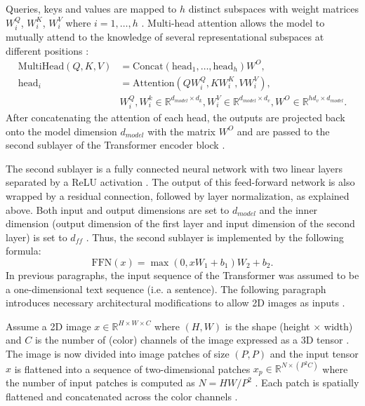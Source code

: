 Queries, keys and values are mapped to $h$ distinct subspaces with weight matrices $W_i^Q$, $W_i^K$, $W_i^V$ where $i=1,\dots,h$ \citep{Vaswani2017}.
Multi-head attention allows the model to mutually attend to the knowledge of several representational subspaces at different positions \citep{Vaswani2017}:
\begin{align}
	\text{MultiHead}(Q,K,V) &= \text{Concat}(\text{head}_1,\dots,\text{head}_h)W^O, \\
	\text{head}_i & = \text{Attention}(QW_i^Q,KW_i^K,VW_i^V), \\
	& W_{i}^{Q}, W_{i}^{k} \in \mathbb{R}^{d_{model}\times d_k} , W_i^V \in \mathbb{R}^{d_{model} \times d_v}, W^O \in \mathbb{R}^{hd_v \times d_{model}}.	
\end{align}
After concatenating the attention of each head, the outputs are projected back onto the model dimension $d_{model}$ with the matrix $W^O$ and are passed to the second sublayer of the Transformer encoder block \citep{Vaswani2017}.
\par
The second sublayer is a fully connected neural network with two linear layers separated by a ReLU activation \citep{Vaswani2017}.
The output of this feed-forward network is also wrapped by a residual connection, followed by layer normalization, as explained above.
Both input and output dimensions are set to $d_{model}$ and the inner dimension (output dimension of the first layer and input dimension of the second layer) is set to $d_{ff}$ \citep{Vaswani2017}.
Thus, the second sublayer is implemented by the following formula:
\begin{equation}
	\text{FFN}(x) = \max(0, xW_1 + b_1)W_2+b_2. 
	\label{equation:FFN}
\end{equation}
In previous paragraphs, the input sequence of the Transformer was assumed to be a one-dimensional text sequence (i.e. a sentence).
The following paragraph introduces necessary architectural modifications to allow 2D images as inputs \citep{Dosovitskiy2020}.
\par
Assume a 2D image $x\in \mathbb{R}^{H\times W \times C }$ where $(H, W)$ is the shape (height $\times$ width) and $C$ is the number of (color) channels of the image expressed as a 3D tensor \citep{Dosovitskiy2020}.
The image is now divided into image patches of size $(P, P)$ and the input tensor $x$ is flattened into a sequence of two-dimensional patches $x_p \in \mathbb{R}^{N \times (P^2C)}$ where the number of input patches is computed as $N = HW/P^2$ \citep{Dosovitskiy2020}.
Each patch is spatially flattened and concatenated across the color channels \citep{Dosovitskiy2020}.
